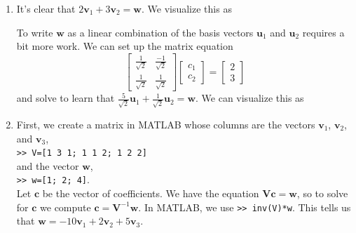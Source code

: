 \begin{sol}
	\begin{enumerate}
		\item It's clear that $2\mathbf{v}_1 + 3\mathbf{v}_2 = \mathbf{w}$. We visualize this as
		\begin{center}
    \end{center}
		
		
		To write $\mathbf{w}$ as a linear combination of the basis vectors $\mathbf{u}_1$ and $\mathbf{u}_2$ requires a bit more work. We can set up the matrix equation
		$$\begin{bmatrix} \frac{1}{\sqrt{2}} & \frac{-1}{\sqrt{2}} \\ \frac{1}{\sqrt{2}} & \frac{1}{\sqrt{2}} \end{bmatrix}\begin{bmatrix} c_1 \\ c_2 \end{bmatrix} = \begin{bmatrix} 2 \\ 3 \end{bmatrix}$$
		and solve to learn that $\frac{5}{\sqrt{2}}\mathbf{u}_1 + \frac{1}{\sqrt{2}}\mathbf{u}_2 = \mathbf{w}$. We can visualize this as
		
	\begin{center}
    \end{center}
    
    \item First, we create a matrix in MATLAB whose columns are the vectors $\mathbf{v}_1$, $\mathbf{v}_2$, and $\mathbf{v}_3$,\\
    \texttt{>> V=[1 3 1; 1 1 2; 1 2 2]}\\
    and the vector $\mathbf{w}$,\\
    \texttt{>> w=[1; 2; 4]}.\\
    Let $\mathbf{c}$ be the vector of coefficients. We have the equation $\mathbf{Vc}=\mathbf{w}$, so to solve for $\mathbf{c}$ we compute $\mathbf{c} = \mathbf{V}^{-1}\mathbf{w}$. In MATLAB, we use \texttt{>> inv(V)*w}. This tells us that $\mathbf{w} = -10\mathbf{v}_1 + 2\mathbf{v}_2 + 5\mathbf{v}_3$.
    

\end{enumerate}
\end{sol}
